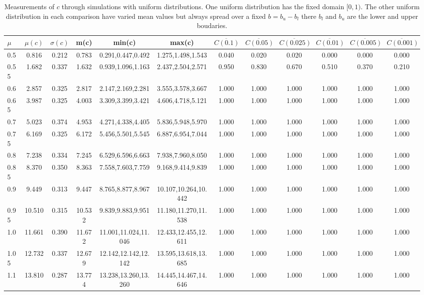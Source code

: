 \begin{table*}[h!]
\begin{center}
\begin{tabular}{| l | c | c | c | c | c | c | c | c | c | c | c |}\hline
$\mu$ & $\mu(c)$ & $\sigma(c)$ & m(c) & min(c) & max(c) & $\overline{C(0.1)}$ & $\overline{C(0.05)}$ & $\overline{C(0.025)}$ & $\overline{C(0.01)}$ & $\overline{C(0.005)}$ & $\overline{C(0.001)}$ \\\hline
0.5 & 0.816 & 0.212 & 0.783 & 0.291,0.447,0.492 & 1.275,1.498,1.543  & 0.040  & 0.020  & 0.020  & 0.000  & 0.000  & 0.000 \\\hline
0.55 & 1.682 & 0.337 & 1.632 & 0.939,1.096,1.163 & 2.437,2.504,2.571  & 0.950  & 0.830  & 0.670  & 0.510  & 0.370  & 0.210 \\\hline
0.6 & 2.857 & 0.325 & 2.817 & 2.147,2.169,2.281 & 3.555,3.578,3.667  & 1.000  & 1.000  & 1.000  & 1.000  & 1.000  & 1.000 \\\hline
0.65 & 3.987 & 0.325 & 4.003 & 3.309,3.399,3.421 & 4.606,4.718,5.121  & 1.000  & 1.000  & 1.000  & 1.000  & 1.000  & 1.000 \\\hline
0.7 & 5.023 & 0.374 & 4.953 & 4.271,4.338,4.405 & 5.836,5.948,5.970  & 1.000  & 1.000  & 1.000  & 1.000  & 1.000  & 1.000 \\\hline
0.75 & 6.169 & 0.325 & 6.172 & 5.456,5.501,5.545 & 6.887,6.954,7.044  & 1.000  & 1.000  & 1.000  & 1.000  & 1.000  & 1.000 \\\hline
0.8 & 7.238 & 0.334 & 7.245 & 6.529,6.596,6.663 & 7.938,7.960,8.050  & 1.000  & 1.000  & 1.000  & 1.000  & 1.000  & 1.000 \\\hline
0.85 & 8.370 & 0.350 & 8.363 & 7.558,7.603,7.759 & 9.168,9.414,9.839  & 1.000  & 1.000  & 1.000  & 1.000  & 1.000  & 1.000 \\\hline
0.9 & 9.449 & 0.313 & 9.447 & 8.765,8.877,8.967 & 10.107,10.264,10.442  & 1.000  & 1.000  & 1.000  & 1.000  & 1.000  & 1.000 \\\hline
0.95 & 10.510 & 0.315 & 10.532 & 9.839,9.883,9.951 & 11.180,11.270,11.538  & 1.000  & 1.000  & 1.000  & 1.000  & 1.000  & 1.000 \\\hline
1.0 & 11.661 & 0.390 & 11.672 & 11.001,11.024,11.046 & 12.433,12.455,12.611  & 1.000  & 1.000  & 1.000  & 1.000  & 1.000  & 1.000 \\\hline
1.05 & 12.732 & 0.337 & 12.679 & 12.142,12.142,12.142 & 13.595,13.618,13.685  & 1.000  & 1.000  & 1.000  & 1.000  & 1.000  & 1.000 \\\hline
1.1 & 13.810 & 0.287 & 13.774 & 13.238,13.260,13.260 & 14.445,14.467,14.646  & 1.000  & 1.000  & 1.000  & 1.000  & 1.000  & 1.000 \\\hline
\end{tabular}
\caption{Measurements of $c$ through simulations
        with uniform distributions.
        One uniform distribution has the fixed domain $[0,1)$.
        The other uniform distribution in each comparison
        have varied mean values but always
        spread over a fixed $b=b_u-b_l$ there $b_l$ and $b_u$ are the lower and upper boudaries.}
\end{center}
\end{table*}